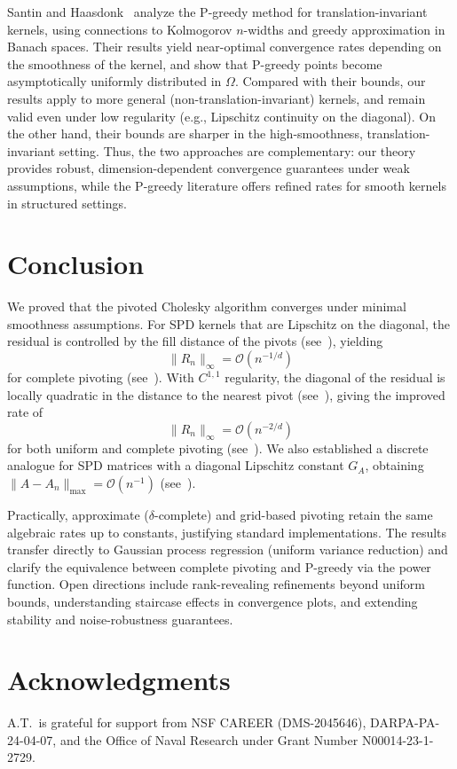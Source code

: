\documentclass{amsart}
\theoremstyle{definition}
\theoremstyle{remark}
\begin{document}
Santin and Haasdonk~\cite{santin6convergence} analyze the P-greedy method for translation-invariant kernels, using connections to Kolmogorov $n$-widths and greedy approximation in Banach spaces. Their results yield near-optimal convergence rates depending on the smoothness of the kernel, and show that P-greedy points become asymptotically uniformly distributed in $\Omega$. Compared with their bounds, our results apply to more general (non-translation-invariant) kernels, and remain valid even under low regularity (e.g., Lipschitz continuity on the diagonal). On the other hand, their bounds are sharper in the high-smoothness, translation-invariant setting. Thus, the two approaches are complementary: our theory provides robust, dimension-dependent convergence guarantees under weak assumptions, while the P-greedy literature offers refined rates for smooth kernels in structured settings.

\section{Conclusion}\label{sec:conclusion}

We proved that the pivoted Cholesky algorithm converges under minimal smoothness assumptions. For SPD kernels that are Lipschitz on the diagonal, the residual is controlled by the fill distance of the pivots (see~), yielding
\[
\|R_n\|_\infty=\mathcal{O}(n^{-1/d})
\]
for complete pivoting (see~). With $C^{1,1}$ regularity, the diagonal of the residual is locally quadratic in the distance to the nearest pivot (see~), giving the improved rate of
\[
\|R_n\|_\infty=\mathcal{O}(n^{-2/d})
\]
for both uniform and complete pivoting (see~). We also established a discrete analogue for SPD matrices with a diagonal Lipschitz constant $G_A$, obtaining $\|A-A_n\|_{\max}=\mathcal{O}(n^{-1})$ (see~).

Practically, approximate ($\delta$-complete) and grid-based pivoting retain the same algebraic rates up to constants, justifying standard implementations. The results transfer directly to Gaussian process regression (uniform variance reduction) and clarify the equivalence between complete pivoting and P-greedy via the power function. Open directions include rank-revealing refinements beyond uniform bounds, understanding staircase effects in convergence plots, and extending stability and noise-robustness guarantees.


\section*{Acknowledgments} 
A.T.~is grateful for support from NSF CAREER (DMS-2045646), DARPA-PA-24-04-07, and the Office of Naval Research under Grant Number N00014-23-1-2729. 



\end{document}
